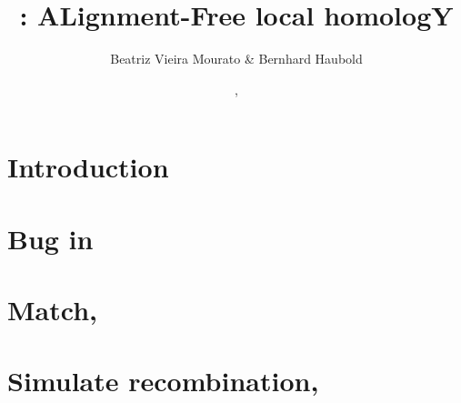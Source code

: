 \documentclass[a4paper]{report}
\begin{document}
\title{: ALignment-Free local homologY}
\author{Beatriz Vieira Mourato \& Bernhard Haubold}
\date{\!\!, }
\maketitle

\tableofcontents

\chapter{Introduction}
\label{ch:int}
\chapter{}
\label{ch:prep}
\chapter{Bug in }

\chapter{}\label{ch:alf}

\chapter{Match, }\label{ch:mat}

\chapter{Simulate recombination, }

\chapter{}



\end{document}
